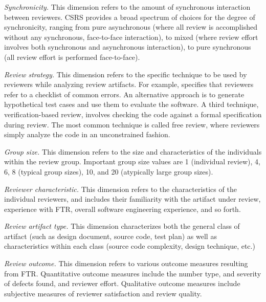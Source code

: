 \begin{itemizenoindent}
\item {\em Synchronicity.} This dimension refers to the amount of
  synchronous interaction between reviewers.  CSRS provides a broad
  spectrum of choices for the degree of synchronicity, ranging from pure
  asynchronous (where all review is accomplished without any synchronous,
  face-to-face interaction), to mixed (where review effort involves both
  synchronous and asynchronous interaction), to pure synchronous (all review
  effort is performed face-to-face). 
  
\item {\em Review strategy.} This dimension refers to the specific
  technique to be used by reviewers while analyzing review artifacts.  For
  example, \cite{Fagan76} specifies that reviewers refer to a checklist of
  common errors.  An alternative approach is to generate hypothetical test
  cases and use them to evaluate the software.  A third technique,
  verification-based review, involves checking the code against a formal
  specification during review. The most common technique is called free
  review, where reviewers simply analyze the code in an unconstrained
  fashion.
  
\item {\em Group size.} This dimension refers to the size
  and characteristics of the individuals within the review group.
  Important group size values are 1 (individual review), 4, 6, 8 (typical
  group sizes), 10, and 20 (atypically large group sizes).  
  
\item {\em Reviewer characteristic.} This dimension refers to the
  characteristics of the individual reviewers, and includes their
  familiarity with the artifact under review, experience with FTR, overall
  software engineering experience, and so forth.
  
\item {\em Review artifact type.} This dimension characterizes both the
  general class of artifact (such as design document, source code, test plan)
  as well as characteristics within each class (source code complexity,
  design technique, etc.)
  
\item {\em Review outcome.} This dimension refers to various outcome
  measures resulting from FTR.  Quantitative outcome measures include the
  number type, and severity of defects found, and reviewer effort.
  Qualitative outcome measures include subjective measures of reviewer
  satisfaction and review quality.

\end{itemizenoindent}


